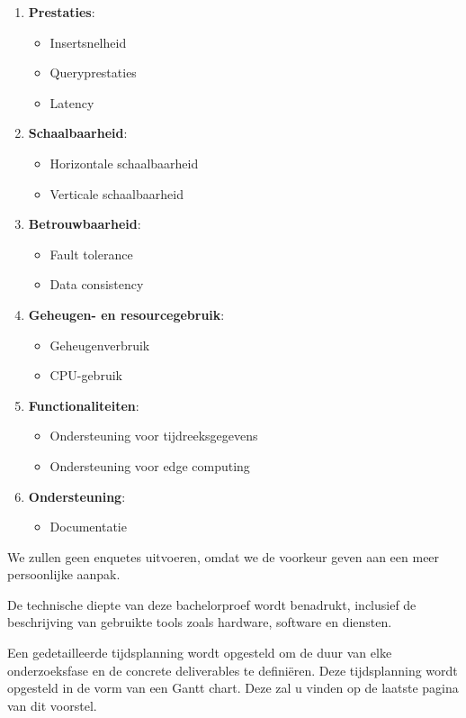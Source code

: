 \begin{enumerate}
    \item \textbf{Prestaties}:
    \begin{itemize}
        \item Insertsnelheid
        \item Queryprestaties
        \item Latency
    \end{itemize}
    
    \item \textbf{Schaalbaarheid}:
    \begin{itemize}
        \item Horizontale schaalbaarheid
        \item Verticale schaalbaarheid
    \end{itemize}
    
    \item \textbf{Betrouwbaarheid}:
    \begin{itemize}
        \item Fault tolerance
        \item Data consistency
    \end{itemize}
    
    \item \textbf{Geheugen- en resourcegebruik}:
    \begin{itemize}
        \item Geheugenverbruik
        \item CPU-gebruik
    \end{itemize}
    
    \item \textbf{Functionaliteiten}:
    \begin{itemize}
        \item Ondersteuning voor tijdreeksgegevens
        \item Ondersteuning voor edge computing
    \end{itemize}
    
    \item \textbf{Ondersteuning}:
    \begin{itemize}
        \item Documentatie
    \end{itemize}
\end{enumerate}

We zullen geen enquetes uitvoeren, omdat we de voorkeur geven aan een meer persoonlijke aanpak.
 
De technische diepte van deze bachelorproef wordt benadrukt,
 inclusief de beschrijving van gebruikte tools zoals hardware, software en diensten.

Een gedetailleerde tijdsplanning wordt opgesteld om de duur van elke onderzoeksfase en de concrete deliverables te definiëren.
Deze tijdsplanning wordt opgesteld in de vorm van een Gantt chart. Deze zal u vinden op de laatste pagina van dit voorstel.


